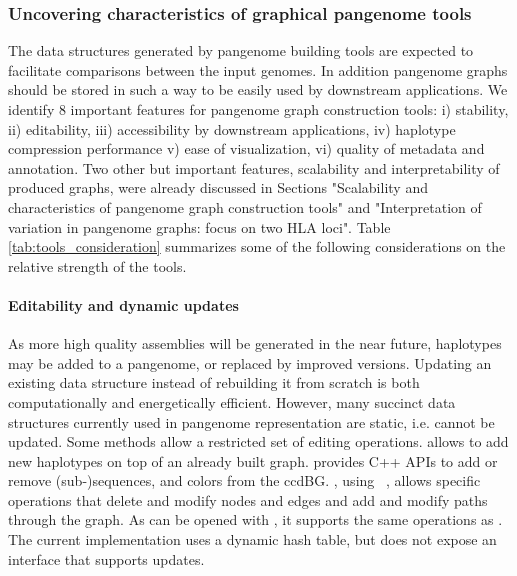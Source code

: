 \subsubsection*{\textbf{Uncovering characteristics of graphical pangenome tools}}
\label{sec:uncovering}
The data structures generated by pangenome building tools are expected to facilitate comparisons between the input genomes. In addition pangenome graphs should be stored in such a way to be easily used by downstream applications.
We identify 8 important features for pangenome graph construction tools: i) stability, ii) editability, iii) accessibility by downstream applications, iv) haplotype compression performance v) ease of visualization, vi) quality of metadata and annotation. Two other but important features, scalability and interpretability of produced graphs, were already discussed in Sections "Scalability and characteristics of pangenome graph construction tools" and "Interpretation of variation in pangenome graphs: focus on two HLA loci". %
Table \ref{tab:tools_consideration} summarizes some of the following considerations on the relative strength of the tools.

\paragraph{\textbf{\textup{Editability and dynamic updates}}}
As more high quality assemblies will be generated in the near future, haplotypes may be added to a pangenome, or replaced by improved versions. Updating an existing data structure instead of rebuilding it from scratch is both computationally and energetically efficient. 
However, many succinct data structures currently used in pangenome representation are static, i.e. cannot be updated. %
Some methods allow a restricted set of editing operations.
\minigraph allows to add new haplotypes on top of an already built graph. \bifrost provides C++ APIs to add or remove \mbox{(sub-)sequences}, \kmers and colors from the ccdBG.
\pggb, using \odgi~\cite{odgi}, allows specific operations that delete and modify nodes and edges and add and modify paths through the graph. As \mcactus can be opened with \odgi, it supports the same operations as \pggb. 
The current \mdbg implementation uses a dynamic hash table, but does not expose an interface that supports updates.

